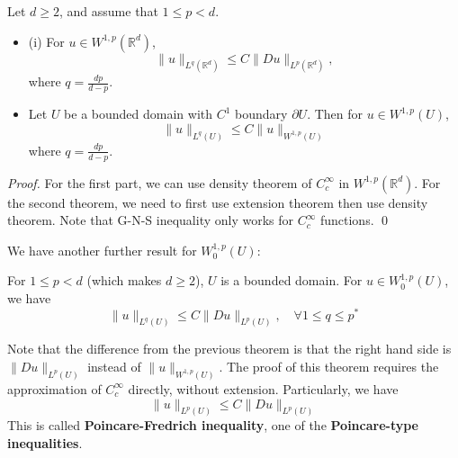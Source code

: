 \begin{theorem}
    Let $d \geq 2$, and assume that $1 \leq p<d$.
    \begin{itemize}
        \item (i) For $u \in W^{1, p}\left(\mathbb{R}^{d}\right)$,
        $$
        \|u\|_{L^{q}\left(\mathbb{R}^{d}\right)} \leq C\|D u\|_{L^{p}\left(\mathbb{R}^{d}\right)},
        $$
        where $q=\frac{d p}{d-p}$.

        \item Let $U$ be a bounded domain with $C^{1}$ boundary $\partial U$. Then for $u \in W^{1, p}(U)$,
        $$
        \|u\|_{L^{q}(U)} \leq C\| u\|_{W^{1, p}(U)}
        $$
        where $q=\frac{d p}{d-p}$.
    \end{itemize}
\end{theorem}
\begin{proof}
     For the first part, we can use density theorem of $C_{c}^{\infty}$ in $W^{1, p}\left(\mathbb{R}^{d}\right)$. For the second theorem, we need to first use extension theorem then use density theorem. Note that G-N-S inequality only works for $C_{c}^{\infty}$ functions.
     \qed 
\end{proof}

We have another further result for $W_0^{1,p}(U)$:
\begin{theorem}
 For $1\leq p<d$ (which makes $d\geq 2$), $U$ is a bounded domain. For $u\in W_0^{1,p}(U)$, we have
$$\|u\|_{L^q(U)}\leq C\|Du\|_{L^p(U)},\quad \forall 1\leq q\leq p^*$$
\end{theorem}
Note that the difference from the previous theorem is that the right hand side is $\|Du\|_{L^p(U)}$ instead of $\|u\|_{W^{1,p}(U)}$. The proof of this theorem requires the approximation of $C_c^{\infty}$ directly, without extension.
Particularly,  we have
$$
\|u\|_{L^p(U)}\leq C\|Du\|_{L^p(U)}
$$
This is called \textbf{Poincare-Fredrich inequality}, one of the \textbf{Poincare-type inequalities}.


